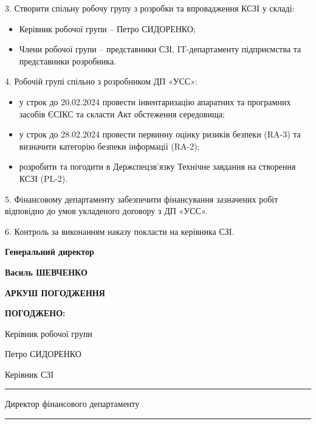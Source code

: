 \documentclass[12pt]{article}
\begin{document}
3. Створити спільну робочу групу з розробки та впровадження КСЗІ у складі:
\begin{itemize}
  \item Керівник робочої групи -- Петро СИДОРЕНКО;
  \item Члени робочої групи -- представники СЗІ, IT-департаменту підприємства та представники розробника.
\end{itemize}

4. Робочій групі спільно з розробником ДП «УСС»:
\begin{itemize}
  \item у строк до 20.02.2024 провести інвентаризацію апаратних та програмних засобів ЄСІКС та скласти Акт обстеження середовища;
  \item у строк до 28.02.2024 провести первинну оцінку ризиків безпеки (RA-3) та визначити категорію безпеки інформації (RA-2);
  \item розробити та погодити в Держспецзв'язку Технічне завдання на створення КСЗІ (PL-2).
\end{itemize}

5. Фінансовому департаменту забезпечити фінансування зазначених робіт відповідно до умов укладеного договору з ДП «УСС».

6. Контроль за виконанням наказу покласти на керівника СЗІ.

\vspace{1.5cm}

\noindent
\parbox[t]{0.5\textwidth}{\bfseries Генеральний директор}%
\parbox[t]{0.5\textwidth}{\raggedleft{}\bfseries Василь ШЕВЧЕНКО}

\newpage

\begin{center}
  \textbf{АРКУШ ПОГОДЖЕННЯ}
\end{center}

\vspace{0.8cm}

\noindent
\textbf{ПОГОДЖЕНО:}

\vspace{0.5cm}
\noindent
\parbox[t]{0.5\textwidth}{Керівник робочої групи}%
\parbox[t]{0.5\textwidth}{\raggedleft{} Петро СИДОРЕНКО}

\vspace{0.8cm}
\noindent
\parbox[t]{0.5\textwidth}{Керівник СЗІ}%
\parbox[t]{0.5\textwidth}{\raggedleft{} \rule{4cm}{0.5pt}}

\vspace{0.8cm}
\noindent
\parbox[t]{0.5\textwidth}{Директор фінансового департаменту}%
\parbox[t]{0.5\textwidth}{\raggedleft{} \rule{4cm}{0.5pt}}
\end{document}
